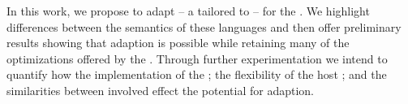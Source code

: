 

%
%
%

% 
%


In this work, we propose to adapt \SOMns{} -- a \Newspeak{} \vm{} tailored to \Newspeak{} -- for the \GracePL{}. We highlight differences between the semantics of these languages and then offer preliminary results showing that adaption is possible while retaining many of the optimizations offered by the \vmframework{}. Through further experimentation we intend to quantify how the implementation of the \tvm{}; the flexibility of the host \vm{}; and the similarities between involved \pls{} effect the potential for adaption.

